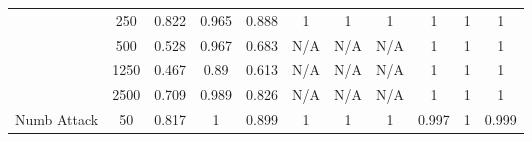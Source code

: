 \begin{table*}[]
{\begin{tabular}{ccccccccccc}
			\multicolumn{1}{|c|}{}                                            & \multicolumn{1}{c|}{250}           & \multicolumn{1}{c|}{0.822}                   & \multicolumn{1}{c|}{0.965}                & \multicolumn{1}{c|}{0.888}            & \multicolumn{1}{c|}{1}                        & \multicolumn{1}{c|}{1}                     & \multicolumn{1}{c|}{1}                 & \multicolumn{1}{c|}{1}                      & \multicolumn{1}{c|}{1}                   & \multicolumn{1}{c|}{1}               \\ \cline{2-11}
			\multicolumn{1}{|c|}{}                                            & \multicolumn{1}{c|}{500}           & \multicolumn{1}{c|}{0.528}                   & \multicolumn{1}{c|}{0.967}                & \multicolumn{1}{c|}{0.683}            & \multicolumn{1}{c|}{N/A}                      & \multicolumn{1}{c|}{N/A}                   & \multicolumn{1}{c|}{N/A}               & \multicolumn{1}{c|}{1}                      & \multicolumn{1}{c|}{1}                   & \multicolumn{1}{c|}{1}               \\ \cline{2-11}
			\multicolumn{1}{|c|}{}                                            & \multicolumn{1}{c|}{1250}          & \multicolumn{1}{c|}{0.467}                   & \multicolumn{1}{c|}{0.89}                 & \multicolumn{1}{c|}{0.613}            & \multicolumn{1}{c|}{N/A}                        & \multicolumn{1}{c|}{N/A}                     & \multicolumn{1}{c|}{N/A}                 & \multicolumn{1}{c|}{1}                      & \multicolumn{1}{c|}{1}                   & \multicolumn{1}{c|}{1}               \\ \cline{2-11}
			\multicolumn{1}{|c|}{}                                            & \multicolumn{1}{c|}{2500}          & \multicolumn{1}{c|}{0.709}                   & \multicolumn{1}{c|}{0.989}                & \multicolumn{1}{c|}{0.826}            & \multicolumn{1}{c|}{N/A}                        & \multicolumn{1}{c|}{N/A}                     & \multicolumn{1}{c|}{N/A}                 & \multicolumn{1}{c|}{1}                      & \multicolumn{1}{c|}{1}                   & \multicolumn{1}{c|}{1}               \\ \hline
			\multicolumn{1}{|c|}{\multirow{6}{*}{Numb Attack}}                & \multicolumn{1}{c|}{50}            & \multicolumn{1}{c|}{0.817}                   & \multicolumn{1}{c|}{1}                    & \multicolumn{1}{c|}{0.899}            & \multicolumn{1}{c|}{1}                        & \multicolumn{1}{c|}{1}                     & \multicolumn{1}{c|}{1}                 & \multicolumn{1}{c|}{0.997}                  & \multicolumn{1}{c|}{1}                   & \multicolumn{1}{c|}{0.999}           \\ \cline{2-11}

\end{tabular}}
\end{table*}
